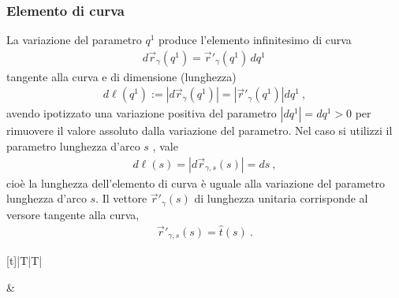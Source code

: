 \documentclass[letterpaper,10pt,italian]{jupyterBook}
\begin{document}
\subsubsection{Elemento di curva}
\label{\detokenize{ch/vector-calculus/geometry:elemento-di-curva}}\label{\detokenize{ch/vector-calculus/geometry:vector-calculus-geometry-lines-infinitesimal}}
\sphinxAtStartPar
La variazione del parametro \(q^1\) produce l’elemento infinitesimo di curva
\begin{equation*}
\begin{split}d \vec{r}_{\gamma}(q^1) = \vec{r}'_\gamma(q^1) \, d q^1 \, \end{split}
\end{equation*}
\sphinxAtStartPar
tangente alla curva e di dimensione (lunghezza)
\begin{equation*}
\begin{split}d \ell(q^1) := \left|d \vec{r}_{\gamma}(q^1)\right| = |\vec{r}'_{\gamma}(q^1)| d q^1 \ ,\end{split}
\end{equation*}
\sphinxAtStartPar
avendo ipotizzato una variazione positiva del parametro \(|d q^1| = d q^1 > 0\) per rimuovere il valore assoluto dalla variazione del parametro. Nel caso si utilizzi il parametro lunghezza d’arco \(s\) {\hyperref[\detokenize{ch/vector-calculus/geometry:arc-length}]{}}, vale
\begin{equation*}
\begin{split}d \ell(s) = |d \vec{r}_{\gamma,s}(s)| = d s \ ,\end{split}
\end{equation*}
\sphinxAtStartPar
cioè la lunghezza dell’elemento di curva è uguale alla variazione del parametro lunghezza d’arco \(s\). Il vettore \(\vec{r}'_\gamma(s)\) di lunghezza unitaria corrisponde al versore tangente alla curva,
\begin{equation*}
\begin{split}\vec{r}'_{\gamma,s}(s) = \hat{t}(s) \ .\end{split}
\end{equation*}

\begin{savenotes}\sphinxattablestart
\centering
\begin{tabulary}{\linewidth}[t]{|T|T|}
\hline

\sphinxAtStartPar
{}
&
\sphinxAtStartPar
{}
\\
\hline
\end{tabulary}
\par
\sphinxattableend\end{savenotes}
\end{document}
